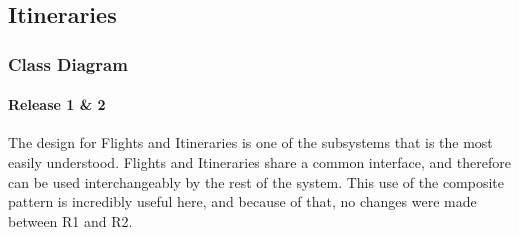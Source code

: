 \newpage

\subsection{Itineraries}\label{subsec:itineraries}

\subsubsection{Class Diagram}

\paragraph{Release 1 \& 2}

\indent
The design for Flights and Itineraries is one of the subsystems that is the most easily understood.
Flights and Itineraries share a common interface, and therefore can be used interchangeably by the rest of the system.
This use of the composite pattern is incredibly useful here, and because of that, no changes were made between R1 and R2.

\begin{center}
\end{center}

